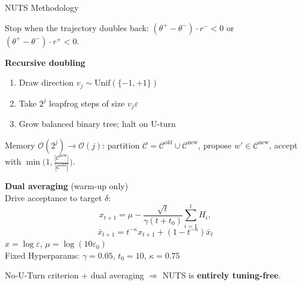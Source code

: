 \documentclass{beamer}
\begin{document}
\begin{frame}{NUTS Methodology}
  \small
  \vspace{-0.2cm}
  \begin{tcolorbox}[keybox, title={No-U-Turn criterion}]
    \footnotesize
    Stop when the trajectory doubles back: $(\theta^+ \!-\! \theta^-)\!\cdot\! r^- \!<\! 0$ \;or\; $(\theta^+ \!-\! \theta^-)\!\cdot\! r^+ \!<\! 0$.
  \end{tcolorbox}

  \vspace{-0.1cm}
  \noindent
  \begin{minipage}[t]{0.48\textwidth}
    \textbf{Recursive doubling}
    \begin{enumerate}\setlength\itemsep{0pt}
      \footnotesize
      \item Draw direction $v_j \!\sim\! \mathrm{Unif}(\{-1,+1\})$
      \item Take $2^j$ leapfrog steps of size $v_j\varepsilon$
      \item Grow balanced binary tree; halt on U-turn
    \end{enumerate}
    \vspace{0.05cm}
    {\footnotesize Memory $\mathcal{O}(2^j)\!\to\!\mathcal{O}(j)$: partition $\mathcal{C}\!=\!\mathcal{C}^{\mathrm{old}}\!\cup\!\mathcal{C}^{\mathrm{new}}$, propose $w'\!\in\!\mathcal{C}^{\mathrm{new}}$, accept with $\min\!\bigl(1,\frac{|\mathcal{C}^{\mathrm{new}}|}{|\mathcal{C}^{\mathrm{old}}|}\bigr)$.}
  \end{minipage}
  \hfill
  \begin{minipage}[t]{0.48\textwidth}
    \textbf{Dual averaging} {\footnotesize (warm-up only)}\\[2pt]
    {\footnotesize Drive acceptance to target $\delta$:}
    \vspace{-0.2cm}
    {\footnotesize\[x_{t+1} \!=\! \mu - \frac{\sqrt{t}}{\gamma(t+t_0)}\!\sum_{i=1}^{t}\!H_i,\]}
    {\footnotesize\[\bar{x}_{t+1} = t^{-\kappa}x_{t+1} + (1-t^{-\kappa})\bar{x}_t\]}
    \vspace{-0.45cm}
    {\footnotesize
    $x\!=\!\log\varepsilon$,\; $\mu\!=\!\log (10\varepsilon_0)$\\[10pt]
    Fixed Hyperparams: $\gamma\!=\!0.05$, $t_0\!=\!10$, $\kappa\!=\!0.75$}
  \end{minipage}

  \vspace{0.1cm}
  \begin{tcolorbox}[keybox]
    \small No-U-Turn criterion + dual averaging $\Rightarrow$ NUTS is \textbf{entirely tuning-free}.
  \end{tcolorbox}
\end{frame}
\end{document}

